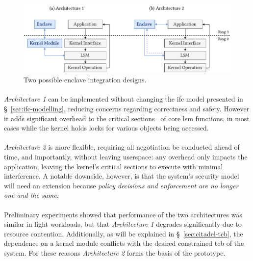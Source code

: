 \begin{figure}[]
    \centering
    \includegraphics[width=0.98\linewidth]{figures/SGX-EnclaveIntegration-Design}
    \caption{Two possible enclave integration designs.}
    \vspace{2mm}
    \label{fig:sgx-integration}
    \vspace{5mm}
\end{figure}

\paragraph{}\textit{Architecture 1} can be implemented without changing the \acrshort{ifc} model presented in §~\ref{sec:ifc-modelling}, reducing concerns regarding correctness and safety. However it adds significant overhead to the critical sections~\cite{Dubois1988SynchronizationCA} of core \acrshort{lsm} functions, in most cases while the kernel holds locks for various objects being accessed.

\paragraph{} \textit{Architecture 2} is more flexible, requiring all negotiation be conducted ahead of time, and importantly, without leaving userspace: any overhead only impacts the application, leaving the kernel's critical sections to execute with minimal interference. A notable downside, however, is that the system's security model will need an extension because \textit{policy decisions and enforcement are no longer one and the same}.

\paragraph{} Preliminary experiments showed that performance of the two architectures was similar in light workloads, but that \textit{Architecture 1} degrades significantly due to resource contention. Additionally, as will be explained in §~\ref{sec:citadel-tcb}, the dependence on a kernel module conflicts with the desired constrained \acrshort{tcb} of the system. For these reasons \textit{Architecture 2} forms the basis of the prototype.


